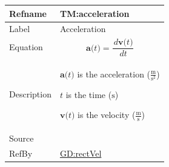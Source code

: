 \documentclass[12pt]{article}
\begin{document}
\medskip
\noindent
\begin{minipage}{\textwidth}
\begin{tabular}{>{\raggedright}p{}>{\raggedright\arraybackslash}p{}}
\toprule \textbf{Refname} & \textbf{TM:acceleration}
\label{TM:acceleration}
\\ \midrule
Label & Acceleration
        
\\ \midrule
Equation & \begin{displaymath}
           \symbf{a}\text{(}t\text{)}=\frac{\,d\symbf{v}\text{(}t\text{)}}{\,dt}
           \end{displaymath}
\\ \midrule
Description & \begin{symbDescription}
              \item{$\symbf{a}\text{(}t\text{)}$ is the acceleration ($\frac{\text{m}}{\text{s}^{2}}$)}
              \item{$t$ is the time (${\text{s}}$)}
              \item{$\symbf{v}\text{(}t\text{)}$ is the velocity ($\frac{\text{m}}{\text{s}}$)}
              \end{symbDescription}
\\ \midrule
Source & \cite{accelerationWiki}
         
\\ \midrule
RefBy & \hyperref[GD:rectVel]{GD:rectVel}
        
\\ \bottomrule
\end{tabular}
\end{minipage}
\end{document}
